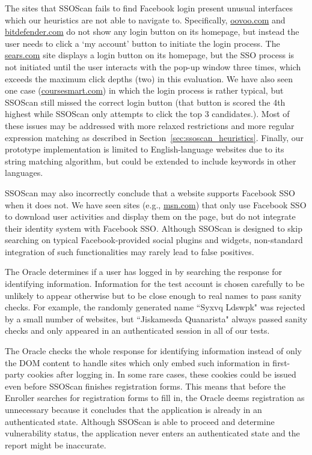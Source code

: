 The sites that SSOScan fails to find Facebook login present unusual interfaces which our heuristics are not able to navigate to.  Specifically, \url{oovoo.com} and \url{bitdefender.com} do not show any login button on its homepage, but instead the user needs to click a `my account' button to initiate the login process.  The \url{sears.com} site displays a login button on its homepage, but the SSO process is not initiated until the user interacts with the pop-up window three times, which exceeds the maximum click depths (two) in this evaluation.  We have also seen one case (\url{coursesmart.com}) in which the login process is rather typical, but SSOScan still missed the correct login button (that button is scored the  4th highest while SSOScan only attempts to click the top 3 candidates.).  Most of these issues may be addressed with more relaxed restrictions and more regular expression matching as described in Section~\ref{sec:ssoscan_heuristics}.  Finally, our prototype implementation is limited to English-language websites due to its string matching algorithm, but could be extended to include keywords in other languages.

SSOScan may also incorrectly conclude that a website supports Facebook SSO when it does not.  We have seen sites (e.g., \url{msn.com}) that only use Facebook SSO to download user activities and display them on the page, but do not integrate their identity system with Facebook SSO.  Although SSOScan is designed to skip searching on typical Facebook-provided social plugins and widgets, non-standard integration of such functionalities may rarely lead to false positives.

 The Oracle determines if a user has logged in by searching the response for identifying information.  Information for the test account is chosen carefully to be unlikely to appear otherwise but to be close enough to real names to pass sanity checks.  For example, the randomly generated name ``Syxvq Ldswpk" was rejected by a small number of websites,  but ``Jiskamesda Quanarista" always passed sanity checks and only appeared in an authenticated session in all of our tests.

The Oracle checks the whole response for identifying information instead of only the DOM content to handle sites which only embed such information in first-party cookies after logging in.  In some rare cases, these cookies could be issued even before SSOScan finishes registration forms.  This means that before the Enroller searches for registration forms to fill in, the Oracle deems registration as unnecessary because it concludes that the application is already in an authenticated state.  Although SSOScan is able to proceed and determine vulnerability status, the application never enters an authenticated state and the report might be inaccurate.

